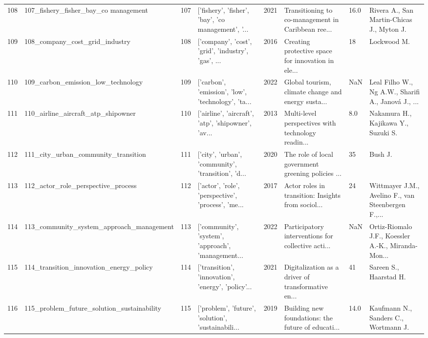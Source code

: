 \begin{tabular}{rlrlrlll}
        108 &               107\_fishery\_fisher\_bay\_co management &       107 & ['fishery', 'fisher', 'bay', 'co management', '... &          2021 & Transitioning to co-management in Caribbean ree... &    16.0 &          Rivera A., San Martin-Chicas J., Myton J. \\
        109 &                     108\_company\_cost\_grid\_industry &       108 & ['company', 'cost', 'grid', 'industry', 'gas', ... &          2016 & Creating protective space for innovation in ele... &      18 &                                        Lockwood M. \\
        110 &                 109\_carbon\_emission\_low\_technology &       109 & ['carbon', 'emission', 'low', 'technology', 'ta... &          2022 & Global tourism, climate change and energy susta... &     NaN & Leal Filho W., Ng A.W., Sharifi A., Janová J., ... \\
        111 &                 110\_airline\_aircraft\_atp\_shipowner &       110 & ['airline', 'aircraft', 'atp', 'shipowner', 'av... &          2013 & Multi-level perspectives with technology readin... &     8.0 &                Nakamura H., Kajikawa Y., Suzuki S. \\
        112 &                111\_city\_urban\_community\_transition &       111 & ['city', 'urban', 'community', 'transition', 'd... &          2020 & The role of local government greening policies ... &      35 &                                            Bush J. \\
        113 &                 112\_actor\_role\_perspective\_process &       112 & ['actor', 'role', 'perspective', 'process', 'me... &          2017 & Actor roles in transition: Insights from sociol... &      24 & Wittmayer J.M., Avelino F., van Steenbergen F.,... \\
        114 &           113\_community\_system\_approach\_management &       113 & ['community', 'system', 'approach', 'management... &          2022 & Participatory interventions for collective acti... &     NaN & Ortiz-Riomalo J.F., Koessler A.-K., Miranda-Mon... \\
        115 &            114\_transition\_innovation\_energy\_policy &       114 & ['transition', 'innovation', 'energy', 'policy'... &          2021 & Digitalization as a driver of transformative en... &      41 &                             Sareen S., Haarstad H. \\
        116 &         115\_problem\_future\_solution\_sustainability &       115 & ['problem', 'future', 'solution', 'sustainabili... &          2019 & Building new foundations: the future of educati... &    14.0 &               Kaufmann N., Sanders C., Wortmann J. \\

\end{tabular}
